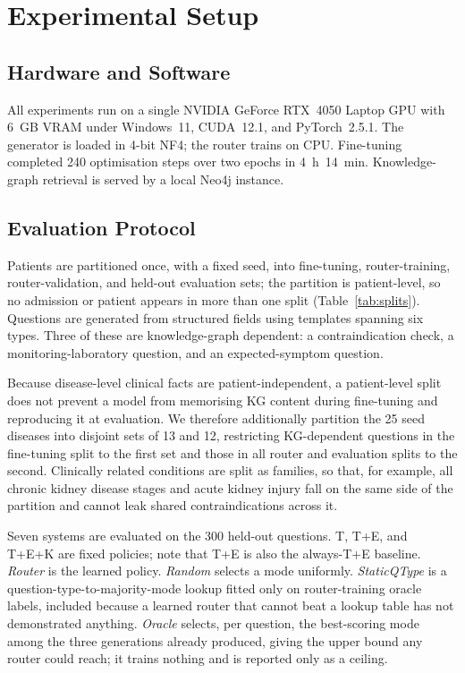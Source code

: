 \documentclass[preprint,12pt]{elsarticle}
\begin{document}
\section{Experimental Setup}

\subsection{Hardware and Software}

All experiments run on a single NVIDIA GeForce RTX~4050 Laptop GPU
with 6~GB VRAM under Windows~11, CUDA~12.1, and PyTorch~2.5.1. The
generator is loaded in 4-bit NF4; the router trains on CPU. Fine-tuning
completed 240 optimisation steps over two epochs in 4~h~14~min.
Knowledge-graph retrieval is served by a local Neo4j instance.

\subsection{Evaluation Protocol}

Patients are partitioned once, with a fixed seed, into fine-tuning,
router-training, router-validation, and held-out evaluation sets; the
partition is patient-level, so no admission or patient appears in more
than one split (Table~\ref{tab:splits}). Questions are generated from
structured fields using templates spanning six types. Three of these
are knowledge-graph dependent: a contraindication check, a
monitoring-laboratory question, and an expected-symptom question.

Because disease-level clinical facts are patient-independent, a
patient-level split does not prevent a model from memorising KG
content during fine-tuning and reproducing it at evaluation. We
therefore additionally partition the 25 seed diseases into disjoint
sets of 13 and 12, restricting KG-dependent questions in the
fine-tuning split to the first set and those in all router and
evaluation splits to the second. Clinically related conditions are
split as families, so that, for example, all chronic kidney disease
stages and acute kidney injury fall on the same side of the partition
and cannot leak shared contraindications across it.

Seven systems are evaluated on the 300 held-out questions. T, T+E, and
T+E+K are fixed policies; note that T+E is also the always-T+E
baseline. \textit{Router} is the learned policy. \textit{Random}
selects a mode uniformly. \textit{StaticQType} is a
question-type-to-majority-mode lookup fitted only on router-training
oracle labels, included because a learned router that cannot beat a
lookup table has not demonstrated anything. \textit{Oracle} selects,
per question, the best-scoring mode among the three generations
already produced, giving the upper bound any router could reach; it
trains nothing and is reported only as a ceiling.
\end{document}
